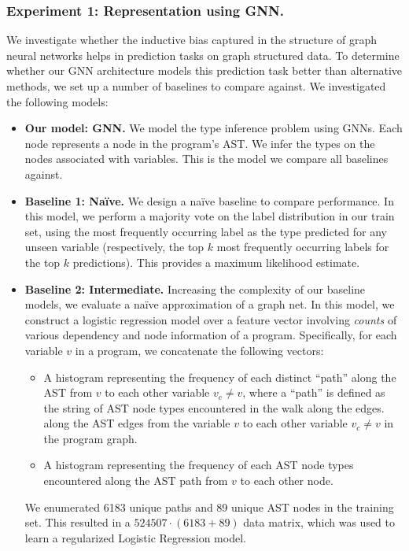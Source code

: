 \subsubsection{Experiment 1: Representation using GNN.}
We investigate whether the inductive bias captured in the structure of graph neural networks helps in prediction tasks on graph structured data.
To determine whether our GNN architecture models this prediction task better than alternative methods, we set up a number of baselines to compare against.
We investigated the following models:
\begin{itemize}[noitemsep,topsep=0pt]
\item \textbf{Our model: GNN.}
  We model the type inference problem using GNNs.
  Each node represents a node in the program's AST.
  We infer the types on the nodes associated with variables.
  This is the model we compare all baselines against.
\item \textbf{Baseline 1: Na\"ive.}
  We design a na\"ive baseline to compare performance.
  In this model, we perform a majority vote on the label distribution in our train set, using the most frequently occurring label as the type predicted for any unseen variable (respectively, the top $k$ most frequently occurring labels for the top $k$ predictions).
  This provides a maximum likelihood estimate.
\item \textbf{Baseline 2: Intermediate.}
  Increasing the complexity of our baseline models, we evaluate a na\"ive approximation of a graph net.
  In this model, we construct a logistic regression model over a feature vector involving \textit{counts} of various dependency and node information of a program.
  Specifically, for each variable $v$ in a program, we concatenate the following vectors:
  \begin{itemize}[noitemsep,topsep=0pt]
  \item A histogram representing the frequency of each distinct ``path'' along the AST from $v$ to each other variable $v_c \neq v$, where a ``path'' is defined as the string of AST node types encountered in the walk along the edges.
    along the AST edges from the variable $v$ to each other variable $v_c \neq v$ in the program graph.
  \item A histogram representing the frequency of each AST node types encountered along the AST path from $v$ to each other node.
  \end{itemize}
  We enumerated 6183 unique paths and 89 unique AST nodes in the training set.
  This resulted in a $524507 \cdot (6183+89)$ data matrix, which was used to learn a regularized Logistic Regression model.

\end{itemize}
